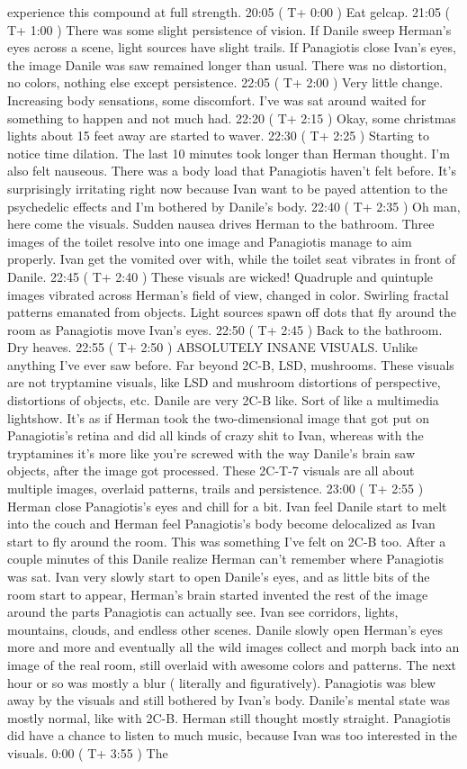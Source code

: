 \documentclass[12pt]{book}
\begin{document}
experience this compound at full strength. 20:05 ( T+ 0:00 ) Eat gelcap. 21:05 ( T+ 1:00 ) There was some slight persistence of vision. If Danile sweep Herman's eyes across a scene, light sources have slight trails. If Panagiotis close Ivan's eyes, the image Danile was saw remained longer than usual. There was no distortion, no colors, nothing else except persistence. 22:05 ( T+ 2:00 ) Very little change. Increasing body sensations, some discomfort. I've was sat around waited for something to happen and not much had. 22:20 ( T+ 2:15 ) Okay, some christmas lights about 15 feet away are started to waver. 22:30 ( T+ 2:25 ) Starting to notice time dilation. The last 10 minutes took longer than Herman thought. I'm also felt nauseous. There was a body load that Panagiotis haven't felt before. It's surprisingly irritating right now because Ivan want to be payed attention to the psychedelic effects and I'm bothered by Danile's body. 22:40 ( T+ 2:35 ) Oh man, here come the visuals. Sudden nausea drives Herman to the bathroom. Three images of the toilet resolve into one image and Panagiotis manage to aim properly. Ivan get the vomited over with, while the toilet seat vibrates in front of Danile. 22:45 ( T+ 2:40 ) These visuals are wicked! Quadruple and quintuple images vibrated across Herman's field of view, changed in color. Swirling fractal patterns emanated from objects. Light sources spawn off dots that fly around the room as Panagiotis move Ivan's eyes. 22:50 ( T+ 2:45 ) Back to the bathroom. Dry heaves. 22:55 ( T+ 2:50 ) ABSOLUTELY INSANE VISUALS. Unlike anything I've ever saw before. Far beyond 2C-B, LSD, mushrooms. These visuals are not tryptamine visuals, like LSD and mushroom distortions of perspective, distortions of objects, etc. Danile are very 2C-B like. Sort of like a multimedia lightshow. It's as if Herman took the two-dimensional image that got put on Panagiotis's retina and did all kinds of crazy shit to Ivan, whereas with the tryptamines it's more like you're screwed with the way Danile's brain saw objects, after the image got processed. These 2C-T-7 visuals are all about multiple images, overlaid patterns, trails and persistence. 23:00 ( T+ 2:55 ) Herman close Panagiotis's eyes and chill for a bit. Ivan feel Danile start to melt into the couch and Herman feel Panagiotis's body become delocalized as Ivan start to fly around the room. This was something I've felt on 2C-B too. After a couple minutes of this Danile realize Herman can't remember where Panagiotis was sat. Ivan very slowly start to open Danile's eyes, and as little bits of the room start to appear, Herman's brain started invented the rest of the image around the parts Panagiotis can actually see. Ivan see corridors, lights, mountains, clouds, and endless other scenes. Danile slowly open Herman's eyes more and more and eventually all the wild images collect and morph back into an image of the real room, still overlaid with awesome colors and patterns. The next hour or so was mostly a blur ( literally and figuratively). Panagiotis was blew away by the visuals and still bothered by Ivan's body. Danile's mental state was mostly normal, like with 2C-B. Herman still thought mostly straight. Panagiotis did have a chance to listen to much music, because Ivan was too interested in the visuals. 0:00 ( T+ 3:55 ) The 
\end{document}
